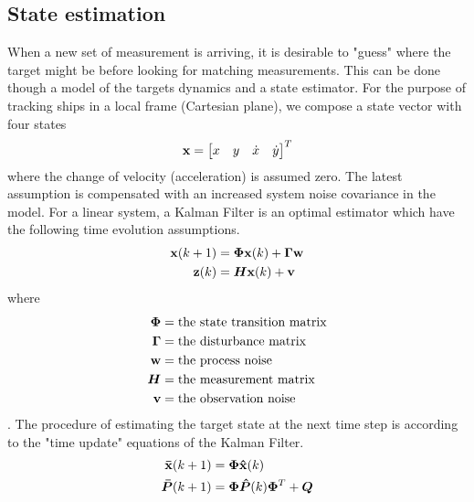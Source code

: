 \subsection{State estimation}
When a new set of measurement is arriving, it is desirable to "guess" where the target might be before looking for matching measurements. This can be done though a model of the targets dynamics and a state estimator. For the purpose of tracking ships in a local frame (Cartesian plane), we compose a state vector with four states
\begin{equation}
\boldsymbol{\mathbf{x}} = \begin{bmatrix}
x & y & \dot{x} & \dot{y}
\end{bmatrix}^T
\label{eq:state_vector}
\end{equation}
where the change of velocity (acceleration) is assumed zero. The latest assumption is compensated with an increased system noise covariance in the model. For a linear system, a Kalman Filter is an optimal estimator which have the following time evolution assumptions.
\begin{equation}
\begin{split}
\boldsymbol{\mathbf{x}}(k+1) &= \bm{\Phi} \boldsymbol{\mathbf{x}}(k) + \bm{\Gamma} \boldsymbol{\mathbf{w}} \\
\boldsymbol{\mathbf{z}}(k) &= \bm{H} \boldsymbol{\mathbf{x}}(k) + \boldsymbol{\mathbf{v}}
\end{split}
\label{eq:kalman_timeUpdate}
\end{equation}
where
\begin{equation}
\begin{split}
\bm{\Phi} 	&= \text{the state transition matrix} \\
\bm{\Gamma}	&= \text{the disturbance matrix} \\
\boldsymbol{\mathbf{w}}		&= \text{the process noise} \\
\bm{H} 		&= \text{the measurement matrix} \\
\boldsymbol{\mathbf{v}} 		&= \text{the observation noise} \\
\end{split}
\end{equation}.
The procedure of estimating the target state at the next time step is according to the "time update" equations of the Kalman Filter.
\begin{equation}
\begin{split}
\boldsymbol{\mathbf{\bar{x}}}(k+1) 	&= \bm{\Phi} \boldsymbol{\mathbf{\hat{x}}}(k) \\
\bm{\bar{P}}(k+1)	&= \bm{\Phi} \bm{\hat{P}}(k)  \bm{\Phi}^T + \bm{Q} \\
\end{split}
\end{equation}
